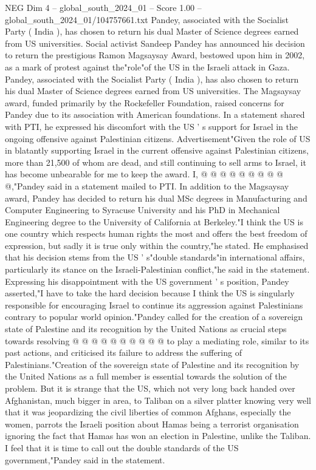 \begin{textsample}{NEG Dim 4 – global\_south\_2024\_01 – Score 1.00 – global\_south\_2024\_01/104757661.txt}  \label{ex:f4_neg_082}
Pandey, associated with the Socialist Party ( India ), has chosen to return his dual Master of Science degrees earned from US universities.
Social activist Sandeep Pandey has announced his decision to return the prestigious Ramon Magsaysay Award, bestowed upon him in 2002, as a mark of protest against the"role"of the US in the Israeli attack in Gaza.
Pandey, associated with the Socialist Party ( India ), has also chosen to return his dual Master of Science degrees earned from US universities.
The Magsaysay award, funded primarily by the Rockefeller Foundation, raised concerns for Pandey due to its association with American foundations.
In a statement shared with PTI, he expressed his discomfort with the US ' s support for Israel in the ongoing offensive against Palestinian citizens.
Advertisement"Given the role of US in blatantly supporting Israel in the current offensive against Palestinian citizens, more than 21,500 of whom are dead, and still continuing to sell arms to Israel, it has become unbearable for me to keep the award.
I, @ @ @ @ @ @ @ @ @ @,"Pandey said in a statement mailed to PTI.
In addition to the Magsaysay award, Pandey has decided to return his dual MSc degrees in Manufacturing and Computer Engineering to Syracuse University and his PhD in Mechanical Engineering degree to the University of California at Berkeley."I think the US is one country which respects human rights the most and offers the best freedom of expression, but sadly it is true only within the country,"he stated.
He emphasised that his decision stems from the US ' s"double standards"in international affairs, particularly its stance on the Israeli-Palestinian conflict,"he said in the statement.
Expressing his disappointment with the US government ' s position, Pandey asserted,"I have to take the hard decision because I think the US is singularly responsible for encouraging Israel to continue its aggression against Palestinians contrary to popular world opinion."Pandey called for the creation of a sovereign state of Palestine and its recognition by the United Nations as crucial steps towards resolving @ @ @ @ @ @ @ @ @ @ to play a mediating role, similar to its past actions, and criticised its failure to address the suffering of Palestinians."Creation of the sovereign state of Palestine and its recognition by the United Nations as a full member is essential towards the solution of the problem.
But it is strange that the US, which not very long back handed over Afghanistan, much bigger in area, to Taliban on a silver platter knowing very well that it was jeopardizing the civil liberties of common Afghans, especially the women, parrots the Israeli position about Hamas being a terrorist organisation ignoring the fact that Hamas has won an election in Palestine, unlike the Taliban.
I feel that it is time to call out the double standards of the US government,"Pandey said in the statement.

\end{textsample}
